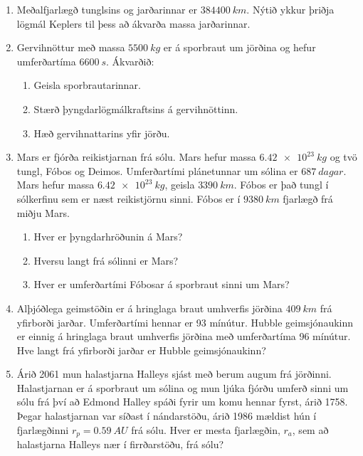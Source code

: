 \ifdefined \wholebook \else\documentclass[oneside]{book}\usepackage{EdlBook}\graphicspath{{figures/}}
\begin{document}
\begin{enumerate}[label = \textbf{Dæmi \thechapter.\arabic*.}]
\item Meðalfjarlægð tunglsins og jarðarinnar er $\SI{384400}{km}$. Nýtið ykkur þriðja lögmál Keplers til þess að ákvarða massa jarðarinnar.

\item Gervihnöttur með massa $\SI{5500}{kg}$ er á sporbraut um jörðina og hefur umferðartíma $\SI{6600}{s}$. Ákvarðið:
\begin{enumerate}[label = \textbf{(\alph*)}]
    \item Geisla sporbrautarinnar.
    \item Stærð þyngdarlögmálkraftsins á gervihnöttinn.
    \item Hæð gervihnattarins yfir jörðu.
\end{enumerate}

\item Mars er fjórða reikistjarnan frá sólu. Mars hefur massa $\SI{6.42e23}{kg}$ og tvö tungl, Fóbos og Deimos. Umferðartími plánetunnar um sólina er $\SI{687}{dagar}$. Mars hefur massa $\SI{6.42e23}{kg}$, geisla $\SI{3390}{km}$. Fóbos er það tungl í sólkerfinu sem er næst reikistjörnu sinni. Fóbos er í $\SI{9380}{km}$ fjarlægð frá miðju Mars. 
\begin{enumerate}[label = \textbf{(\alph*)}]
    \item Hver er þyngdarhröðunin á Mars?
    
    \item Hversu langt frá sólinni er Mars?
    
    \item Hver er umferðartími Fóbosar á sporbraut sinni um Mars?
\end{enumerate}

\item Alþjóðlega geimstöðin er á hringlaga braut umhverfis jörðina $\SI{409}{km}$ frá yfirborði jarðar. Umferðartími hennar er 93 mínútur. Hubble geimsjónaukinn er einnig á hringlaga braut umhverfis jörðina með umferðartíma 96 mínútur. Hve langt frá yfirborði jarðar er Hubble geimsjónaukinn?

\item Árið 2061 mun halastjarna Halleys sjást með berum augum frá jörðinni. Halastjarnan er á sporbraut um sólina og mun ljúka fjórðu umferð sinni um sólu frá því að Edmond Halley spáði fyrir um komu hennar fyrst, árið 1758. Þegar halastjarnan var síðast í nándarstöðu, árið 1986 mældist hún í fjarlægðinni $r_p = \SI{0.59}{AU}$ frá sólu. Hver er mesta fjarlægðin, $r_a$, sem að halastjarna Halleys nær í firrðarstöðu, frá sólu?


\end{enumerate}
\end{document}
